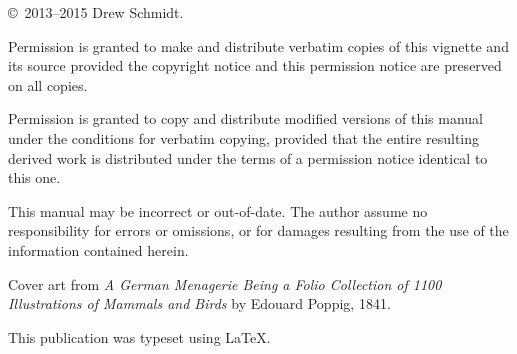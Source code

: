 \null
\vfill
\copyright\ 2013--2015 Drew Schmidt.

Permission is granted to make and distribute verbatim copies of
this vignette and its source provided the copyright notice and
this permission notice are preserved on all copies.

Permission is granted to copy and distribute modified versions of this manual under the conditions for verbatim copying, provided that the entire resulting derived work is distributed under the terms of a permission notice identical to this one. 

This manual may be incorrect or out-of-date.  The author assume
no responsibility for errors or omissions, or for damages resulting
from the use of the information contained herein.

Cover art from \emph{A German Menagerie Being a Folio Collection of 1100 Illustrations of Mammals and Birds} by Edouard Poppig, 1841.

This publication was typeset using \LaTeX.
